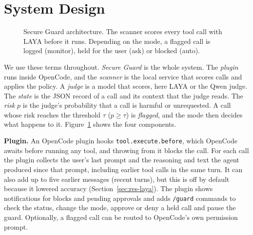 \documentclass[sigconf,nonacm]{acmart}
\begin{document}
\section{System Design}
\begin{figure}[t]
\centering
{}
\caption{Secure Guard architecture. The scanner scores every tool call with LAYA before it runs. Depending on the mode, a flagged call is logged (monitor), held for the user (ask) or blocked (auto).}
\label{fig:arch}
\end{figure}

We use these terms throughout. \emph{Secure Guard} is the whole system. The \emph{plugin} runs inside OpenCode, and the \emph{scanner} is the local service that scores calls and applies the policy. A \emph{judge} is a model that scores, here LAYA or the Qwen judge. The \emph{state} is the JSON record of a call and its context that the judge reads. The \emph{risk} $p$ is the judge's probability that a call is harmful or unrequested. A call whose risk reaches the threshold $\tau$ ($p\geq\tau$) is \emph{flagged}, and the mode then decides what happens to it. Figure~\ref{fig:arch} shows the four components.

\textbf{Plugin.} An OpenCode plugin hooks \texttt{tool.execute.before}, which OpenCode awaits before running any tool, and throwing from it blocks the call. For each call the plugin collects the user's last prompt and the reasoning and text the agent produced since that prompt, including earlier tool calls in the same turn. It can also add up to five earlier messages (recent turns), but this is off by default because it lowered accuracy (Section~\ref{sec:res-laya}). The plugin shows notifications for blocks and pending approvals and adds \texttt{/guard} commands to check the status, change the mode, approve or deny a held call and pause the guard. Optionally, a flagged call can be routed to OpenCode's own permission prompt.
\end{document}
